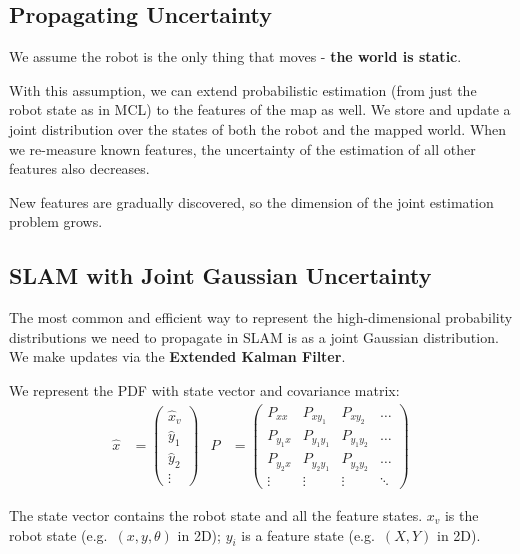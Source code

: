 \documentclass[11pt]{article}
\begin{document}
\subsection{Propagating Uncertainty}
We assume the robot is the only thing that moves - \textbf{the world is static}.

With this assumption, we can extend probabilistic estimation (from just the robot state as in MCL) to the features of the map as well.
We store and update a joint distribution over the states of both the robot and the mapped world.
When we re-measure known features, the uncertainty of the estimation of all other features also decreases.

New features are gradually discovered, so the dimension of the joint estimation problem grows.

\subsection{SLAM with Joint Gaussian Uncertainty}
The most common and efficient way to represent the high-dimensional probability distributions we need to propagate in SLAM is as a joint Gaussian distribution.
We make updates via the \textbf{Extended Kalman Filter}.

We represent the PDF with state vector and covariance matrix:
\begin{align*}
  \hat{x} &= 
  \begin{pmatrix}
    \hat{x}_v \\
    \hat{y}_1 \\
    \hat{y}_2 \\
    \vdots
  \end{pmatrix}
  & P &=
  \begin{pmatrix}
    P_{xx} & P_{xy_1} & P_{xy_2} & \dots \\
    P_{y_1x} & P_{y_1y_1} & P_{y_1y_2} & \dots \\
    P_{y_2x} & P_{y_2y_1} & P_{y_2y_2} & \dots \\
    \vdots & \vdots & \vdots & \ddots
  \end{pmatrix}
\end{align*}

The state vector contains the robot state and all the feature states.
$x_v$ is the robot state (e.g.\ $(x, y, \theta)$ in 2D); $y_i$ is a feature state (e.g.\ $(X, Y)$ in 2D).
\end{document}
